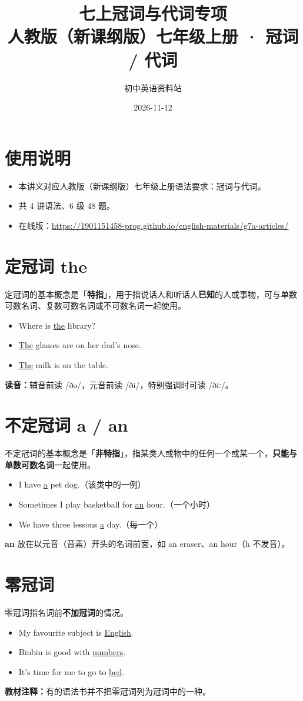 \documentclass[11pt,a4paper]{ctexart}
\title{\textbf{七上冠词与代词专项}\\[4pt]
\large 人教版（新课纲版）七年级上册 · 冠词 / 代词}
\author{初中英语资料站}
\date{2026-11-12}
\begin{document}
\maketitle

\section*{使用说明}
\begin{itemize}[leftmargin=1.4em]
\item 本讲义对应人教版（新课纲版）七年级上册语法要求：冠词与代词。
\item 共 4 讲语法、6 级 48 题。
\item 在线版：\url{https://1901151458-prog.github.io/english-materials/g7a-articles/}
\end{itemize}

\section{定冠词 the}
定冠词的基本概念是「\textbf{特指}」，用于指说话人和听话人\textbf{已知}的人或事物，可与单数可数名词、复数可数名词或不可数名词一起使用。
\begin{itemize}[leftmargin=1.4em]
\item Where is \underline{the} library?
\item \underline{The} glasses are on her dad's nose.
\item \underline{The} milk is on the table.
\end{itemize}
\textbf{读音：}辅音前读 /ðə/，元音前读 /ði/，特别强调时可读 /ðiː/。

\section{不定冠词 a / an}
不定冠词的基本概念是「\textbf{非特指}」，指某类人或物中的任何一个或某一个，\textbf{只能与单数可数名词}一起使用。
\begin{itemize}[leftmargin=1.4em]
\item I have \underline{a} pet dog.（该类中的一例）
\item Sometimes I play basketball for \underline{an} hour.（一个小时）
\item We have three lessons \underline{a} day.（每一个）
\end{itemize}
\textbf{an} 放在以元音（音素）开头的名词前面，如 an eraser、an hour（h 不发音）。

\section{零冠词}
零冠词指名词前\textbf{不加冠词}的情况。
\begin{itemize}[leftmargin=1.4em]
\item My favourite subject is \underline{English}.
\item Binbin is good with \underline{numbers}.
\item It's time for me to go to \underline{bed}.
\end{itemize}
\textbf{教材注释：}有的语法书并不把零冠词列为冠词中的一种。
\end{document}

